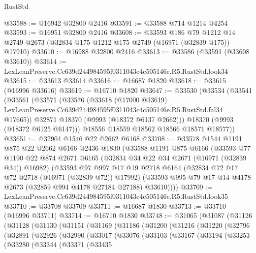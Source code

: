 \begin{lexlean}{RustStd}
\begin{coremodule}
@33588 := @16942 @32800 @2416
@33591 := @33588 @714 @1214 @4254
@33593 := @16951 @32800 @2416
@33608 := @33593
    @186
    @79
    @1212
    @14
    @2749
    @2673
    (@32834 @175 @1212 @175 @2749 (@16971 (@32839 @175)) @17910)
@33610 := @16988 @32800 @2416
@33613 := @33586 (@33591 (@33608 @33610))
@33614 := LexLeanPreserve.Cc639d244984595f0311043c4c505146e.R5.RustStd.look34
@33615 := @33613 @33614
@33616 := @16687 @1820
@33618 := @33615 (@16996 @33616)
@33619 := @16710 @1820
@33647 := @33530
    (@33534
      (@33541
        (@33561
          (@33571
            (@33576
              (@33618
                (@17000 @33619)
                LexLeanPreserve.Cc639d244984595f0311043c4c505146e.R5.RustStd.fal34
                @17665))
            @32871
            @18370
            (@9993 (@18372 @6137 @2662)))
          @18370
          (@9993 (@18372 @6125 @6147)))
        @18556
        @18559
        @18562
        @18566
        @18571
        @18577))
@33651 := @32904 @1546 @22 @2662 @6168
@33708 := @33578
    @1544
    @1191
    @875
    @22
    @2662
    @6166
    @2436
    @1830
    (@33588
      @1191
      @875
      @6166
      (@33593
        @77
        @1190
        @22
        @874
        @2671
        @6165
        (@32834 @34 @22 @34 @2671 (@16971 (@32839 @34)) @16982)
        (@33593
          @97
          @997
          @17
          @19
          @2718
          @6164
          (@32834 @72 @17 @72 @2718 (@16971 (@32839 @72)) @17992)
          (@33593 @995 @79 @17 @14 @4178 @2673 (@32859 @994 @4178 @27184 @27188) @33610))))
@33709 := LexLeanPreserve.Cc639d244984595f0311043c4c505146e.R5.RustStd.look35
@33710 := @33708 @33709
@33711 := @16687 @1830
@33713 := @33710 (@16996 @33711)
@33714 := @16710 @1830
@33748 := @31065
    (@31087
      (@31126
        (@31128
          (@31130
            (@31151
              (@31169
                (@31186
                  (@31200
                    (@31216
                      (@31220
                        (@32796
                          (@32891
                            (@32926
                              (@32990
                                (@33017
                                  (@33076
                                    (@33103
                                      (@33167
                                        (@33194
                                          (@33253
                                            (@33280
                                              (@33344
                                                (@33371
                                                  (@33435

\end{coremodule}
\end{lexlean}
